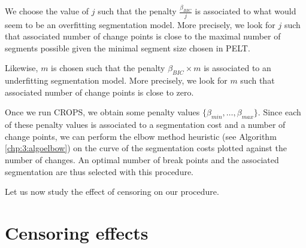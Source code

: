 We choose the value of $j$ such that the penalty $\frac{\beta_{BIC}}{j}$ is associated to what would seem to be an overfitting segmentation model. More precisely, we look for $j$ such that associated number of change points is close to the maximal number of segments possible given the minimal segment size chosen in PELT. 

Likewise, $m$ is chosen such that the penalty $\beta_{BIC}\times m$ is associated to an underfitting segmentation model. More precisely, we look for $m$ such that associated number of change points is close to zero.     

Once we run CROPS, we obtain some penalty values $\{\beta_{min},\dots,\beta_{max}\}$. Since each of these penalty values is associated to a segmentation cost and a number of change points, we can perform the elbow method heuristic (see Algorithm \ref{chp:3:algoelbow}) on the curve of the segmentation costs plotted against the number of changes. An optimal number of break points and the associated segmentation are thus selected with this procedure.

Let us now study the effect of censoring on our procedure.

\section{Censoring effects}\label{chp:4:2}

%

